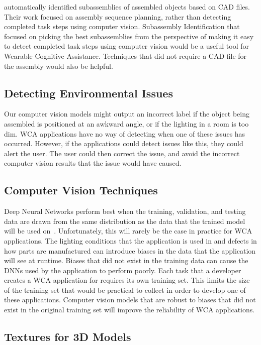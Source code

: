 \citet{subassembly_identification} automatically identified subassemblies of
assembled objects based on CAD files.
Their work focused on assembly sequence
planning, rather than detecting completed task steps using computer vision.
Subassembly Identification that focused on picking the best subassemblies from
the perspective of making it easy to detect completed task steps using computer
vision would be a useful tool for Wearable Cognitive Assistance.
Techniques that did not require a CAD file for the assembly would also be
helpful.

\subsection{Detecting Environmental Issues}

Our computer vision models might output an incorrect label if the object being
assembled is positioned at an awkward angle, or if the lighting in a room is
too dim.
WCA applications have no way of detecting when one of these issues has
occurred.
However, if the applications could detect issues like this, they could alert the
user.
The user could then correct the issue, and avoid the incorrect computer vision
results that the issue would have caused.

\subsection{Computer Vision Techniques}

Deep Neural Networks perform best when the training, validation, and testing
data are drawn from the same distribution as the data that the trained model
will be used on~\cite{pmlr-v97-recht19a}.
Unfortunately, this will rarely be the case in practice for WCA applications.
The lighting conditions that the application is used in and defects in how parts
are manufactured can introduce biases in the data that the application will see
at runtime.
Biases that did not exist in the training data can cause the DNNs used by the
application to perform poorly.
Each task that a developer creates a WCA application for requires its own
training set.
This limits the size of the training set that would be practical to collect in
order to develop one of these applications.
Computer vision models that are robust to biases that did not exist in the
original training set will improve the reliability of WCA applications.

\subsection{Textures for 3D Models}

